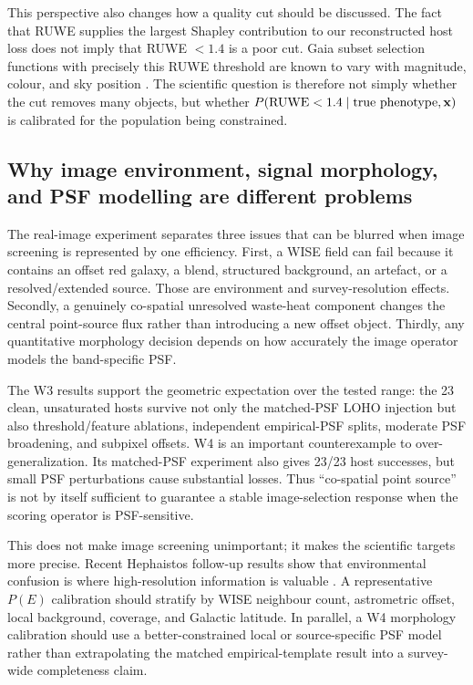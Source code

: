\documentclass[fleqn,usenatbib]{mnras}
\begin{document}
This perspective also changes how a quality cut should be discussed. The fact that RUWE supplies the largest Shapley contribution to our reconstructed host loss does not imply that RUWE $<1.4$ is a poor cut. Gaia subset selection functions with precisely this RUWE threshold are known to vary with magnitude, colour, and sky position \citep{EverallBoubert2022}. The scientific question is therefore not simply whether the cut removes many objects, but whether $P({\rm RUWE}<1.4\mid{\rm true\ phenotype},\mathbf{x})$ is calibrated for the population being constrained.

\subsection{Why image environment, signal morphology, and PSF modelling are different problems}

The real-image experiment separates three issues that can be blurred when image screening is represented by one efficiency. First, a WISE field can fail because it contains an offset red galaxy, a blend, structured background, an artefact, or a resolved/extended source. Those are environment and survey-resolution effects. Secondly, a genuinely co-spatial unresolved waste-heat component changes the central point-source flux rather than introducing a new offset object. Thirdly, any quantitative morphology decision depends on how accurately the image operator models the band-specific PSF.

The W3 results support the geometric expectation over the tested range: the 23 clean, unsaturated hosts survive not only the matched-PSF LOHO injection but also threshold/feature ablations, independent empirical-PSF splits, moderate PSF broadening, and subpixel offsets. W4 is an important counterexample to over-generalization. Its matched-PSF experiment also gives 23/23 host successes, but small PSF perturbations cause substantial losses. Thus ``co-spatial point source'' is not by itself sufficient to guarantee a stable image-selection response when the scoring operator is PSF-sensitive.

This does not make image screening unimportant; it makes the scientific targets more precise. Recent Hephaistos follow-up results show that environmental confusion is where high-resolution information is valuable \citep{Ren2025,Ren2026,Zackrisson2026}. A representative $P(E)$ calibration should stratify by WISE neighbour count, astrometric offset, local background, coverage, and Galactic latitude. In parallel, a W4 morphology calibration should use a better-constrained local or source-specific PSF model rather than extrapolating the matched empirical-template result into a survey-wide completeness claim.
\end{document}
